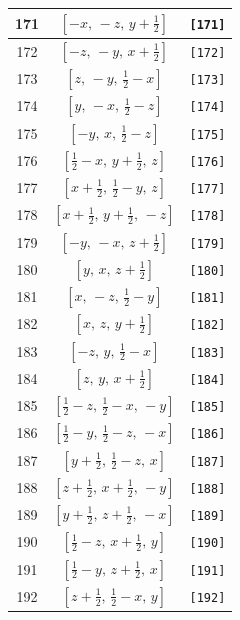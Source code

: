 \documentclass[fleqn,8pt]{jsarticle}
\begin{document}
\begin{longtable}{ccc}
171 & $\left[ - x,\, - z,\, y + \frac{1}{2} \right]$ & {\tt [171]} \\ \hline
172 & $\left[ - z,\, - y,\, x + \frac{1}{2} \right]$ & {\tt [172]} \\ \hline
173 & $\left[ z,\, - y,\, \frac{1}{2} - x \right]$ & {\tt [173]} \\ \hline
174 & $\left[ y,\, - x,\, \frac{1}{2} - z \right]$ & {\tt [174]} \\ \hline
175 & $\left[ - y,\, x,\, \frac{1}{2} - z \right]$ & {\tt [175]} \\ \hline
176 & $\left[ \frac{1}{2} - x,\, y + \frac{1}{2},\, z \right]$ & {\tt [176]} \\ \hline
177 & $\left[ x + \frac{1}{2},\, \frac{1}{2} - y,\, z \right]$ & {\tt [177]} \\ \hline
178 & $\left[ x + \frac{1}{2},\, y + \frac{1}{2},\, - z \right]$ & {\tt [178]} \\ \hline
179 & $\left[ - y,\, - x,\, z + \frac{1}{2} \right]$ & {\tt [179]} \\ \hline
180 & $\left[ y,\, x,\, z + \frac{1}{2} \right]$ & {\tt [180]} \\ \hline
181 & $\left[ x,\, - z,\, \frac{1}{2} - y \right]$ & {\tt [181]} \\ \hline
182 & $\left[ x,\, z,\, y + \frac{1}{2} \right]$ & {\tt [182]} \\ \hline
183 & $\left[ - z,\, y,\, \frac{1}{2} - x \right]$ & {\tt [183]} \\ \hline
184 & $\left[ z,\, y,\, x + \frac{1}{2} \right]$ & {\tt [184]} \\ \hline
185 & $\left[ \frac{1}{2} - z,\, \frac{1}{2} - x,\, - y \right]$ & {\tt [185]} \\ \hline
186 & $\left[ \frac{1}{2} - y,\, \frac{1}{2} - z,\, - x \right]$ & {\tt [186]} \\ \hline
187 & $\left[ y + \frac{1}{2},\, \frac{1}{2} - z,\, x \right]$ & {\tt [187]} \\ \hline
188 & $\left[ z + \frac{1}{2},\, x + \frac{1}{2},\, - y \right]$ & {\tt [188]} \\ \hline
189 & $\left[ y + \frac{1}{2},\, z + \frac{1}{2},\, - x \right]$ & {\tt [189]} \\ \hline
190 & $\left[ \frac{1}{2} - z,\, x + \frac{1}{2},\, y \right]$ & {\tt [190]} \\ \hline
191 & $\left[ \frac{1}{2} - y,\, z + \frac{1}{2},\, x \right]$ & {\tt [191]} \\ \hline
192 & $\left[ z + \frac{1}{2},\, \frac{1}{2} - x,\, y \right]$ & {\tt [192]} \\ \hline

\end{longtable}
\end{document}
